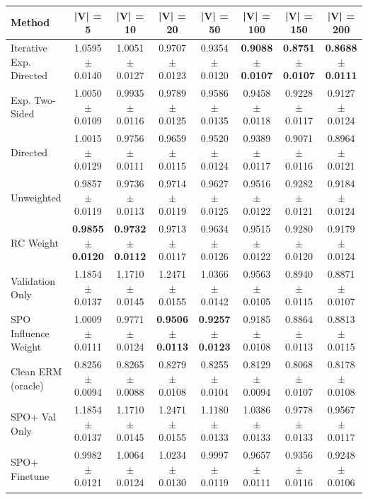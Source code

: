 \begin{tabular}{lccccccc}
\toprule
Method & |V| = 5 & |V| = 10 & |V| = 20 & |V| = 50 & |V| = 100 & |V| = 150 & |V| = 200 \\
\midrule
Iterative Exp. Directed & 1.0595 $\pm$ 0.0140 & 1.0051 $\pm$ 0.0127 & 0.9707 $\pm$ 0.0123 & 0.9354 $\pm$ 0.0120 & \textbf{0.9088 $\pm$ 0.0107} & \textbf{0.8751 $\pm$ 0.0107} & \textbf{0.8688 $\pm$ 0.0111} \\
Exp. Two-Sided & 1.0050 $\pm$ 0.0109 & 0.9935 $\pm$ 0.0116 & 0.9789 $\pm$ 0.0125 & 0.9586 $\pm$ 0.0135 & 0.9458 $\pm$ 0.0118 & 0.9228 $\pm$ 0.0117 & 0.9127 $\pm$ 0.0124 \\
Directed & 1.0015 $\pm$ 0.0129 & 0.9756 $\pm$ 0.0111 & 0.9659 $\pm$ 0.0115 & 0.9520 $\pm$ 0.0124 & 0.9389 $\pm$ 0.0117 & 0.9071 $\pm$ 0.0116 & 0.8964 $\pm$ 0.0121 \\
Unweighted & 0.9857 $\pm$ 0.0119 & 0.9736 $\pm$ 0.0113 & 0.9714 $\pm$ 0.0119 & 0.9627 $\pm$ 0.0125 & 0.9516 $\pm$ 0.0122 & 0.9282 $\pm$ 0.0121 & 0.9184 $\pm$ 0.0124 \\
RC Weight & \textbf{0.9855 $\pm$ 0.0120} & \textbf{0.9732 $\pm$ 0.0112} & 0.9713 $\pm$ 0.0117 & 0.9634 $\pm$ 0.0126 & 0.9515 $\pm$ 0.0122 & 0.9280 $\pm$ 0.0120 & 0.9179 $\pm$ 0.0124 \\
Validation Only & 1.1854 $\pm$ 0.0137 & 1.1710 $\pm$ 0.0145 & 1.2471 $\pm$ 0.0155 & 1.0366 $\pm$ 0.0142 & 0.9563 $\pm$ 0.0105 & 0.8940 $\pm$ 0.0115 & 0.8871 $\pm$ 0.0107 \\
SPO Influence Weight & 1.0009 $\pm$ 0.0111 & 0.9771 $\pm$ 0.0124 & \textbf{0.9506 $\pm$ 0.0113} & \textbf{0.9257 $\pm$ 0.0123} & 0.9185 $\pm$ 0.0108 & 0.8864 $\pm$ 0.0113 & 0.8813 $\pm$ 0.0115 \\
Clean ERM (oracle) & 0.8256 $\pm$ 0.0094 & 0.8265 $\pm$ 0.0088 & 0.8279 $\pm$ 0.0108 & 0.8255 $\pm$ 0.0104 & 0.8129 $\pm$ 0.0094 & 0.8068 $\pm$ 0.0107 & 0.8178 $\pm$ 0.0108 \\
SPO+ Val Only & 1.1854 $\pm$ 0.0137 & 1.1710 $\pm$ 0.0145 & 1.2471 $\pm$ 0.0155 & 1.1180 $\pm$ 0.0133 & 1.0386 $\pm$ 0.0133 & 0.9778 $\pm$ 0.0133 & 0.9567 $\pm$ 0.0117 \\
SPO+ Finetune & 0.9982 $\pm$ 0.0121 & 1.0064 $\pm$ 0.0124 & 1.0234 $\pm$ 0.0130 & 0.9997 $\pm$ 0.0119 & 0.9657 $\pm$ 0.0111 & 0.9356 $\pm$ 0.0116 & 0.9248 $\pm$ 0.0106 \\
\bottomrule
\end{tabular}
